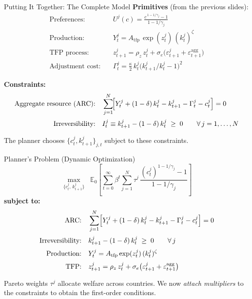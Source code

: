 \documentclass[aspectratio=169,11pt]{beamer}
\begin{document}
\begin{frame}{Putting It Together: The Complete Model}
\footnotesize
\textbf{Primitives} (from the previous slides):
\begin{align*}
\text{Preferences:}   &\quad U^j(c) = \tfrac{c^{\,1 - 1/\gamma_j} - 1}{1 - 1/\gamma_j} \\[1pt]
\text{Production:}    &\quad Y_t^j = A_{\mathrm{tfp}}\,\exp(z_t^j)\,(k_t^j)^{\zeta} \\[1pt]
\text{TFP process:}   &\quad z_{t+1}^j = \rho_z\, z_t^j + \sigma_e\bigl(\varepsilon_{t+1}^j + \varepsilon_{t+1}^{\mathrm{agg}}\bigr) \\[1pt]
\text{Adjustment cost:}&\quad \Gamma_t^j = \tfrac{\kappa}{2}\, k_t^j \bigl(k_{t+1}^j/k_t^j - 1\bigr)^{2}
\end{align*}

\textbf{Constraints:}
\begin{align*}
\text{Aggregate resource (ARC):} &\quad \sum_{j=1}^{N}\!\Bigl[ Y_t^j + (1-\delta)\, k_t^j - k_{t+1}^j - \Gamma_t^j - c_t^j \Bigr] = 0 \\[2pt]
\text{Irreversibility:} &\quad I_t^j \equiv k_{t+1}^j - (1-\delta)\, k_t^j \;\geq\; 0 \qquad \forall\, j = 1,\ldots,N
\end{align*}

\smallskip
The planner chooses $\{c_t^j, k_{t+1}^j\}_{j,t}$ subject to these constraints.
\end{frame}

\begin{frame}{Planner's Problem (Dynamic Optimization)}
\footnotesize
\[
\max_{\{c_t^j,\, k_{t+1}^j\}} \;\; \mathbb{E}_0\!\left[\sum_{t=0}^{\infty} \beta^{t} \sum_{j=1}^{N} \tau^j \, \frac{(c_t^j)^{1 - 1/\gamma_j} - 1}{1 - 1/\gamma_j}\right]
\]
\textbf{subject to:}
\begin{align*}
\text{ARC:} &\quad \sum_{j=1}^{N} \Bigl[ Y_t^j + (1-\delta)\,k_t^j - k_{t+1}^j - \Gamma_t^j - c_t^j \Bigr] = 0 \\[2pt]
\text{Irreversibility:} &\quad k_{t+1}^j - (1-\delta)\,k_t^j \;\geq\; 0 \qquad \forall\, j \\[2pt]
\text{Production:} &\quad Y_t^j = A_{\mathrm{tfp}}\exp(z_t^j)\,(k_t^j)^{\zeta} \\[2pt]
\text{TFP:}         &\quad z_{t+1}^j = \rho_z\, z_t^j + \sigma_e\bigl(\varepsilon_{t+1}^j + \varepsilon_{t+1}^{\mathrm{agg}}\bigr)
\end{align*}

\smallskip
Pareto weights $\tau^j$ allocate welfare across countries. We now \emph{attach multipliers} to the constraints to obtain the first-order conditions.
\end{frame}
\end{document}

